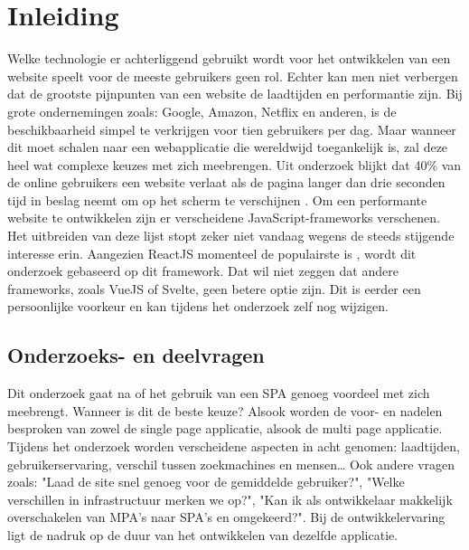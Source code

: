 \documentclass{hogent-article}
\affiliation{
  \textsuperscript{1} \href{mailto:jens.penneman@student.hogent.be}{jens.penneman@student.hogent.be}}
\affiliation{\href{https://github.com/jenspennemanTI109/RM-paper-2122-Penneman}{Github repo: https://github.com/jenspennemanTI109/RM-paper-2122-Penneman}}
\begin{document}
\flushbottom
\maketitle
\tableofcontents
\thispagestyle{empty}


\section{Inleiding}
Welke technologie er achterliggend gebruikt wordt voor het ontwikkelen van een website speelt voor de meeste gebruikers geen rol.
Echter kan men niet verbergen dat de grootste pijnpunten van een website de laadtijden en performantie zijn.
Bij grote ondernemingen zoals: Google, Amazon, Netflix en anderen, is de beschikbaarheid simpel te verkrijgen voor tien gebruikers per dag.
Maar wanneer dit moet schalen naar een webapplicatie die wereldwijd toegankelijk is, zal deze heel wat complexe keuzes met zich meebrengen.
Uit onderzoek blijkt dat 40\% van de online gebruikers een website verlaat als de pagina langer dan drie seconden tijd in beslag neemt om op het scherm te verschijnen \autocite{LoadingSpeedWedevs2021}.
Om een performante website te ontwikkelen zijn er verscheidene JavaScript-frameworks verschenen. Het uitbreiden van deze lijst stopt zeker niet vandaag wegens de steeds stijgende interesse erin.
Aangezien ReactJS momenteel de populairste is \autocite{Gathoni2022}, wordt dit onderzoek gebaseerd op dit framework.
Dat wil niet zeggen dat andere frameworks, zoals VueJS of Svelte, geen betere optie zijn.
Dit is eerder een persoonlijke voorkeur en kan tijdens het onderzoek zelf nog wijzigen.

\subsection{Onderzoeks- en deelvragen}
Dit onderzoek gaat na of het gebruik van een SPA genoeg voordeel met zich meebrengt.
Wanneer is dit de beste keuze?
Alsook worden de voor- en nadelen besproken van zowel de single page applicatie, alsook de multi page applicatie.
Tijdens het onderzoek worden verscheidene aspecten in acht genomen:
laadtijden,
gebruikerservaring,
verschil tussen zoekmachines en mensen\dots
Ook andere vragen zoals:
"Laad de site snel genoeg voor de gemiddelde gebruiker?",
"Welke verschillen in infrastructuur merken we op?",
"Kan ik als ontwikkelaar makkelijk overschakelen van MPA's naar SPA's en omgekeerd?".
Bij de ontwikkelervaring ligt de nadruk op de duur van het ontwikkelen van dezelfde applicatie.
\end{document}
